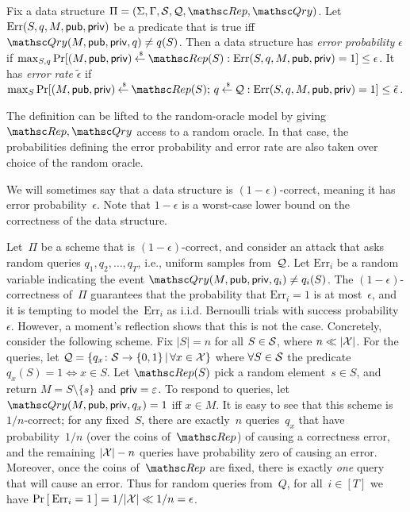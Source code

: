 \begin{definition} \rm
Fix a data structure $\setprim=(\Sigma,\Gamma,\calS,\calQ,\Rep,
\Qry)$. Let $\mathrm{Err}(S,q,M,{\sf pub},{\sf priv})$ be a predicate that is
true iff $\Qry(M, \pubaux,\privaux, q) \neq q(S)$.  Then a data structure
has \emph{error probability} $\epsilon$ if
$\max_{S,q}\Pr[(M,\pubaux,\privaux) \getsr \Rep(S) :
\mathrm{Err}(S,q,M,\pubaux,\privaux)=1 ] \leq \epsilon$.
%
It has \emph{error rate} $\tilde{\epsilon}$ if
$\max_{S}\Pr[(M,\pubaux,\privaux) \getsr \Rep(S);\, q \getsr \calQ :
\mathrm{Err}(S,q,M,\pubaux,\privaux)=1] \leq \tilde{\epsilon}$. \hfill\dqed
\end{definition}

\noindent The definition can be lifted to the random-oracle model by
giving $\Rep, \Qry$ access to a random oracle. In that case, the
probabilities defining the error probability and error rate are also
taken over choice of the random oracle.

We will sometimes say that a data structure is
$(1-\epsilon)$-correct, meaning it has error probability~$\epsilon$.
Note that $1-\epsilon$ is a worst-case lower bound on the
correctness of the data structure. 


\def\bin{{\sf Bin}}
Let~$\Pi$ be a scheme that is $(1-\epsilon)$-correct, and consider
an attack that asks random queries $q_1,q_2,\ldots,q_T$, i.e.,
uniform samples from~${\cal Q}$.
Let $\mathrm{Err}_i$ be a random variable indicating the event $\Qry(M,\pubaux,\privaux,q_i)\neq q_i(S)$.
The $(1-\epsilon)$-correctness of~$\Pi$ guarantees that the probability that $\mathrm{Err}_i=1$ is at most~$\epsilon$,
and it is tempting to model the~$\mathrm{Err}_i$ as i.i.d. Bernoulli trials with success probability~$\epsilon$.
However, a moment's reflection shows that this is not the case.  Concretely, consider the following scheme.  Fix $|S|=n$ for all $S \in {\cal S}$, where $n \ll |{\cal X}|$.  For the queries, let ${\cal Q} = \{q_x\colon {\cal S} \to \{0,1\} \,|\, \forall x \in {\cal X}\}$ where $\forall S \in {\cal S}$ the predicate $q_x(S)=1 \Leftrightarrow x \in S$.  Let $\Rep(S)$ pick a random element~$s \in S$, and return $M = S \setminus \{s\}$ and ${\sf priv} = \varepsilon$.  To respond to queries, let~$\Qry(M,\pubaux,\privaux,q_x)=1$ iff $x \in M$.  It is easy to see that this scheme is $1/n$-correct; for any fixed~$S$, there are exactly~$n$ queries~$q_x$ that have probability~$1/n$  (over the coins of~$\Rep$) of causing a correctness error, and the remaining $|{\cal X}|-n$ queries have probability zero of causing an error.  Moreover, once the coins of~$\Rep$ are fixed, there is exactly \emph{one} query that will cause an error.  Thus for random queries from~$Q$, for all~$i\in[T]$ we have $\Pr\left[\: \mathrm{Err}_i=1 \:\right]=1/|{\cal X}| \ll 1/n = \epsilon$.

